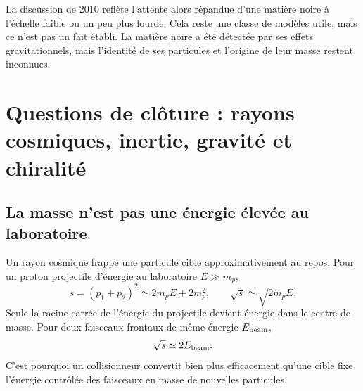 La discussion de 2010 reflète l’attente alors répandue d’une matière noire à l’échelle faible ou un peu plus lourde. Cela reste une classe de modèles utile, mais ce n’est pas un fait établi. La matière noire a été détectée par ses effets gravitationnels, mais l’identité de ses particules et l’origine de leur masse restent inconnues.

\section{Questions de clôture : rayons cosmiques, inertie, gravité et chiralité}

\subsection{La masse n’est pas une énergie élevée au laboratoire}

\begin{classroomqa}
\end{classroomqa}

Un rayon cosmique frappe une particule cible approximativement au repos. Pour un proton projectile d’énergie au laboratoire \(E\gg m_p\),
\begin{equation}
  s=(p_1+p_2)^2
  \simeq2m_pE+2m_p^2,
  \qquad
  \sqrt{s}\simeq\sqrt{2m_pE}.
  \label{eq:l09-fixed-target-s}
\end{equation}
Seule la racine carrée de l’énergie du projectile devient énergie dans le centre de masse. Pour deux faisceaux frontaux de même énergie \(E_{\rm beam}\),
\begin{equation}
  \sqrt{s}\simeq2E_{\rm beam}.
  \label{eq:l09-collider-s}
\end{equation}
C’est pourquoi un collisionneur convertit bien plus efficacement qu’une cible fixe l’énergie contrôlée des faisceaux en masse de nouvelles particules.

